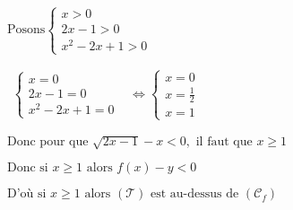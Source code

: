 \documentclass[12pt,a4paper]{article}
\begin{document}
\begin{enumerate}
          \(
          \text{Posons}
          \begin{cases}
              x > 0      \\
              2x - 1 > 0 \\
              x^2 - 2x + 1>0
          \end{cases}
          \)

          \(
          \begin{aligned}
              \begin{cases}
                  x = 0      \\
                  2x - 1 = 0 \\
                  x^2 - 2x + 1 = 0
              \end{cases}
               & \Leftrightarrow
              \begin{cases}
                  x = 0         \\
                  x=\frac{1}{2} \\
                  x = 1
              \end{cases}
          \end{aligned}
          \)


          \(
          \text{Donc pour que } \sqrt{2x - 1} - x < 0, \text{ il faut que } x \geq 1
          \)

          \(
          \text{Donc si } x \geq 1 \text{ alors } f(x) - y < 0
          \)

          \(
          \text{D'où si } x \geq 1 \text{ alors } (\mathcal{T}) \text{ est au-dessus de } (\mathcal{C}_f)
          \)

\end{enumerate}
\end{document}
